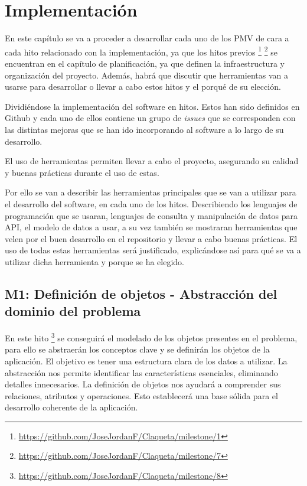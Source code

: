 \chapter{Implementación}

En este capítulo se va a proceder a desarrollar cada uno de los PMV de cara a cada hito relacionado con 
la implementación, ya que los hitos previos \footnote{\url{https://github.com/JoseJordanF/Claqueta/milestone/1}} 
\footnote{\url{https://github.com/JoseJordanF/Claqueta/milestone/7}} se encuentran en el capítulo de 
planificación, ya que definen la infraestructura y organización del proyecto. Además, habrá que 
discutir que herramientas van a usarse para desarrollar o llevar a cabo estos hitos y el porqué de su 
elección. 

Dividiéndose la implementación del software en hitos. Estos han sido definidos en Github
y cada uno de ellos contiene un grupo de \textit{issues} que se corresponden con las distintas
mejoras que se han ido incorporando al software a lo largo de su desarrollo.

El uso de herramientas permiten llevar a cabo el proyecto, asegurando su calidad y buenas prácticas 
durante el uso de estas.

Por ello se van a describir las herramientas principales que se van a utilizar para el desarrollo 
del software, en cada uno de los hitos. Describiendo los lenguajes de programación que se usaran, 
lenguajes de consulta y manipulación de datos para API, el modelo de datos a usar, a su vez también 
se mostraran herramientas que velen por el buen desarrollo en el repositorio y llevar a cabo buenas 
prácticas. El uso de todas estas herramientas será justificado, explicándose así para qué se va a 
utilizar dicha herramienta y porque se ha elegido.

\section{M1: Definición de objetos - Abstracción del dominio del problema}

En este hito \footnote{\url{https://github.com/JoseJordanF/Claqueta/milestone/8}} se conseguirá el 
modelado de los objetos presentes en el problema, para ello se abstraerán 
los conceptos clave y se definirán los objetos de la aplicación. El objetivo es tener una estructura 
clara de los datos a utilizar. La abstracción nos permite identificar las características 
esenciales, eliminando detalles innecesarios. La definición de objetos nos ayudará a comprender sus 
relaciones, atributos y operaciones. Esto establecerá una base sólida para el desarrollo coherente 
de la aplicación.

